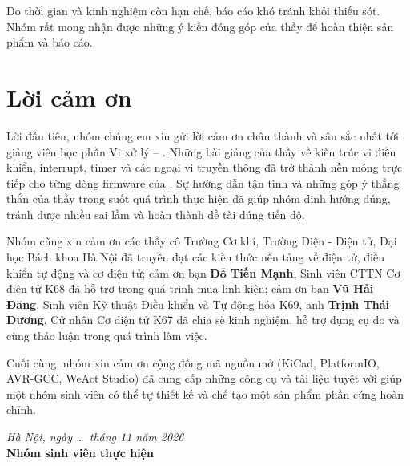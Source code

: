 Do thời gian và kinh nghiệm còn hạn chế, báo cáo khó tránh khỏi thiếu sót. Nhóm rất mong nhận được những ý kiến đóng góp của thầy để hoàn thiện sản phẩm và báo cáo.

\chapter*{Lời cảm ơn}

Lời đầu tiên, nhóm chúng em xin gửi lời cảm ơn chân thành và sâu sắc nhất tới giảng viên học phần Vi xử lý -- \textbf{\gvhd}. Những bài giảng của thầy về kiến trúc vi điều khiển, interrupt, timer và các ngoại vi truyền thông đã trở thành nền móng trực tiếp cho từng dòng firmware của \proj. Sự hướng dẫn tận tình và những góp ý thẳng thắn của thầy trong suốt quá trình thực hiện đã giúp nhóm định hướng đúng, tránh được nhiều sai lầm và hoàn thành đề tài đúng tiến độ.

Nhóm cũng xin cảm ơn các thầy cô Trường Cơ khí, Trường Điện - Điện tử, Đại học Bách khoa Hà Nội đã truyền đạt các kiến thức nền tảng về điện tử, điều khiển tự động và cơ điện tử; cảm ơn bạn \textbf{Đỗ Tiến Mạnh}, Sinh viên CTTN Cơ điện tử K68 đã hỗ trợ trong quá trình mua linh kiện; cảm ơn bạn \textbf{Vũ Hải Đăng}, Sinh viên Kỹ thuật Điều khiển và Tự động hóa K69, anh \textbf{Trịnh Thái Dương}, Cử nhân Cơ điện tử K67 đã chia sẻ kinh nghiệm, hỗ trợ dụng cụ đo và cùng thảo luận trong quá trình làm việc.

Cuối cùng, nhóm xin cảm ơn cộng đồng mã nguồn mở (KiCad, PlatformIO, AVR-GCC, WeAct Studio) đã cung cấp những công cụ và tài liệu tuyệt vời giúp một nhóm sinh viên có thể tự thiết kế và chế tạo một sản phẩm phần cứng hoàn chỉnh.

\vspace{1cm}
\begin{flushright}
\begin{minipage}{0.45\linewidth}
\centering
\textit{Hà Nội, ngày \ldots\ tháng 11 năm 2026}\\[4pt]
\textbf{Nhóm sinh viên thực hiện}\\[2.2cm]
\end{minipage}
\end{flushright}
